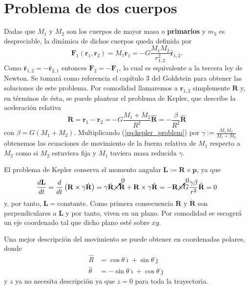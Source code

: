 \section{Problema de dos cuerpos}
\label{sec:2body_problem}
Dadas que $M_1$ y $M_2$ son los cuerpos de mayor masa o \textbf{primarios} y $m_3$ es despreciable, la dinámica de dichos cuerpos queda definida por
\begin{equation}
 \mathbf{F}_1(\mathbf{r}_1,\mathbf{r}_2) = M_1 \ddot{\mathbf{r}}_1 = -G \frac{M_1 M_2}{r_{1,2}^2} \hat{\mathbf{r}}_{1,2}.
 \label{eq:2body_eqs_motion}
\end{equation}
Como $\hat{\mathbf{r}}_{1,2} = - \hat{\mathbf{r}}_{2,1}$ entonces $\mathbf{F}_2 = -\mathbf{F}_1$, lo cual es equivalente a la tercera ley de Newton. Se tomará como referencia el capítulo 3 del Goldstein \cite{Goldstein2007} para obtener las soluciones de este problema. Por comodidad llamaremos a $\mathbf{r}_{1,2}$ simplemente $\mathbf{R}$ y, en términos de ésta, se puede plantear el problema de Kepler, que describe la aceleración relativa
\begin{equation}
 \ddot{\mathbf{R}} = \ddot{\mathbf{r}}_1 - \ddot{\mathbf{r}}_2 = -G \frac{M_1 + M_2}{R^2} \hat{\mathbf{R}} = - \frac{\beta}{R^2}\hat{\mathbf{R}}
 \label{eq:kepler_problem}
\end{equation}
con $\beta = G \left(M_1 + M_2 \right)$. Multiplicando (\ref{eq:kepler_problem}) por $\gamma := \frac{M_1 M_2}{M_1+M_2}$ obtenemos las ecuaciones de movimiento de la fuerza relativa de $M_1$ respecto a $M_2$ como si $M_2$ estuviera fija y $M_1$ tuviera masa reducida $\gamma$.

El problema de Kepler conserva el momento angular $\mathbf{L} := \mathbf{R} \times \mathbf{p}$, ya que
\begin{equation}
 \frac{d\mathbf{L}}{dt} = \frac{d}{dt}\left(\mathbf{R} \times \gamma\dot{\mathbf{R}} \right) = \gamma\dot{\mathbf{R}} \cancelto{0}{\times}\dot{\mathbf{R}} + \mathbf{R} \times \gamma \ddot{\mathbf{R}} = - \mathbf{R} \cancelto{0}{\times} G\frac{\gamma \beta}{r^2}\hat{\mathbf{R}} = 0
\end{equation}
y, por tanto, $\mathbf{L} = \text{constante}$. Como primera consecuencia $\mathbf{R}$ y $\dot{\mathbf{R}}$ son perpendiculares a $\mathbf{L}$ y por tanto, viven en un plano. Por comodidad se escogerá un eje coordenado tal que dicho plano esté sobre $xy$. 

Una mejor descripción del movimiento se puede obtener en coordenadas polares, donde
\begin{align}
 \hat{R} &= \cos \theta \hat{\imath} + \sin \theta \hat{\jmath} \nonumber \\
 \hat{\theta} &= -\sin \theta \hat{\imath} + \cos \theta \hat{\jmath}
 \label{eq:polar_transformation}
\end{align}
y $z$ ya no necesita descripción ya que $z=0$ para toda la trayectoria. 

